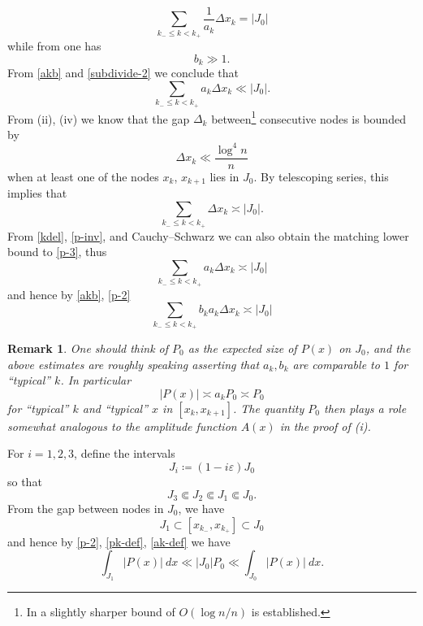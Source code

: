 \documentclass[12pt]{amsart}
\newtheorem{remark}[theorem]{Remark}
\newcommand{\eps}{\varepsilon}
\begin{document}
\begin{equation}\label{p-inv}
    \sum_{k_- \leq k < k_+} \frac{1}{a_k} \Delta x_k = |J_0|
\end{equation}
while from  one has
\begin{equation}\label{akb} b_k \gg 1.\end{equation}
From \eqref{akb} and \eqref{subdivide-2} we conclude that
\begin{equation}\label{p-3}
    \sum_{k_- \leq k < k_+} a_k \Delta x_k \ll |J_0|.
\end{equation}
From (ii), (iv) we know that the gap $\Delta_k$ between\footnote{In \cite[p. 192]{esz} a slightly sharper bound of $O(\log n/n)$ is established.} consecutive nodes is bounded by
\begin{equation}\label{deltak-bound} \Delta x_k \ll \frac{\log^4 n}{n}\end{equation}
when at least one of the nodes $x_k$, $x_{k+1}$ lies in $J_0$.  By telescoping series, this implies that
\begin{equation}\label{kdel}
    \sum_{k_- \leq k < k_+} \Delta x_k \asymp |J_0|.
\end{equation}
From \eqref{kdel}, \eqref{p-inv}, and Cauchy--Schwarz we can also obtain the matching lower bound to \eqref{p-3}, thus
\begin{equation}\label{p-3-improv}
    \sum_{k_- \leq k < k_+} a_k \Delta x_k \asymp |J_0|
\end{equation}
and hence by \eqref{akb}, \eqref{p-2}
\begin{equation}\label{p-2-improv}
    \sum_{k_- \leq k < k_+} b_k a_k \Delta x_k \asymp |J_0|
\end{equation}

\begin{remark}
One should think of $P_0$ as the expected size of $P(x)$ on $J_0$, and the above estimates are roughly speaking asserting that $a_k, b_k$ are comparable to $1$ for ``typical'' $k$.  In particular
$$ |P(x)| \asymp a_k P_0 \asymp P_0$$
for ``typical'' $k$ and ``typical'' $x$ in $[x_k, x_{k+1}]$.  The quantity $P_0$ then plays a role somewhat analogous to the amplitude function $A(x)$ in the proof of (i).
\end{remark}

For $i=1,2,3$, define the intervals
$$ J_i \coloneqq (1-i\eps) J_0$$
so that
$$ J_3 \Subset J_2 \Subset J_1 \Subset J_0.$$
From the gap between nodes in $J_0$, we have
$$ J_1 \subset [x_{k_-}, x_{k_+}] \subset J_0$$
and hence by \eqref{p-2}, \eqref{pk-def}, \eqref{ak-def} we have
\begin{equation}\label{mark} \int_{J_1} |P(x)|\ dx \ll |J_0| P_0 \ll \int_{J_0} |P(x)|\ dx.
\end{equation}
\end{document}
